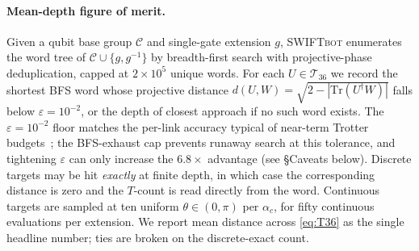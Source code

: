 \documentclass[twocolumn,superscriptaddress,showpacs,nofootinbib,notitlepage,preprintnumbers,secnumarabic,amssymb, nobibnotes, aps, prd]{revtex4-2}
\newcommand{\SWIFTbot}{\textsc{SWIFTbot}\xspace}
\begin{document}
\paragraph*{Mean-depth figure of merit.}
Given a qubit base group $\mathcal{C}$ and single-gate extension $g$, \SWIFTbot enumerates the word tree of $\mathcal{C}\cup\{g,g^{-1}\}$ by breadth-first search with projective-phase deduplication, capped at $2\times 10^5$ unique words. For each $U\in\mathcal{T}_{36}$ we record the shortest BFS word whose projective distance $d(U,W) = \sqrt{2 - |\mathrm{Tr}(U^\dagger W)|}$ falls below $\varepsilon = 10^{-2}$, or the depth of closest approach if no such word exists. The $\varepsilon = 10^{-2}$ floor matches the per-link accuracy typical of near-term Trotter budgets~\cite{Lamm:2019bik}; the BFS-exhaust cap prevents runaway search at this tolerance, and tightening $\varepsilon$ can only increase the $6.8\times$ advantage (see \S Caveats below). Discrete targets may be hit \emph{exactly} at finite depth, in which case the corresponding distance is zero and the $T$-count is read directly from the word. Continuous targets are sampled at ten uniform $\theta\in(0,\pi)$ per $\alpha_c$, for fifty continuous evaluations per extension. We report mean distance across \cref{eq:T36} as the single headline number; ties are broken on the discrete-exact count.
\end{document}
